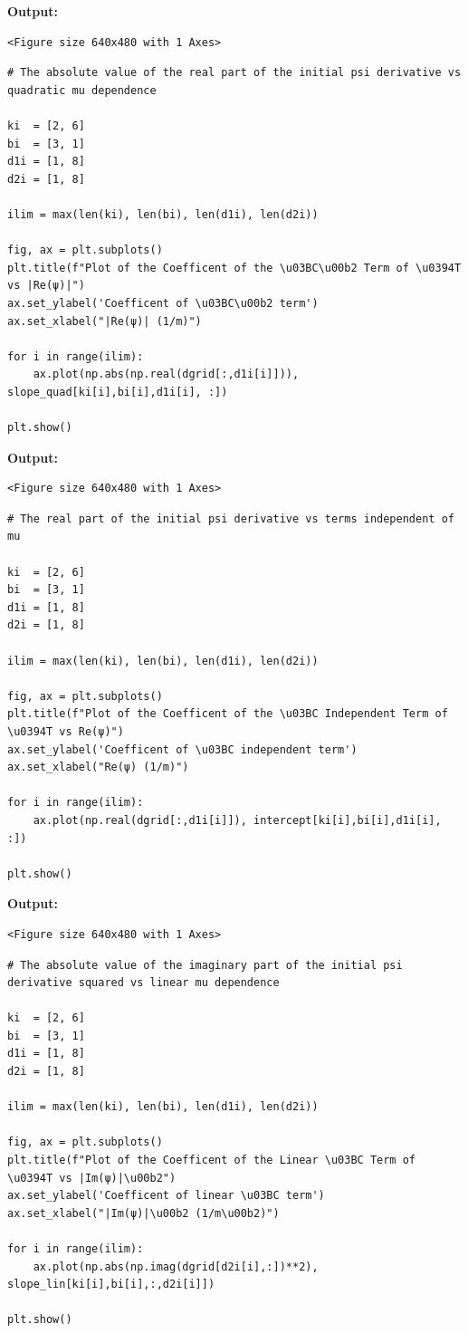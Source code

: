\documentclass{article}
\begin{document}
\textbf{Output:}\begin{verbatim}
<Figure size 640x480 with 1 Axes>
\end{verbatim}

\begin{lstlisting}
# The absolute value of the real part of the initial psi derivative vs quadratic mu dependence

ki  = [2, 6]
bi  = [3, 1]
d1i = [1, 8]
d2i = [1, 8]

ilim = max(len(ki), len(bi), len(d1i), len(d2i))

fig, ax = plt.subplots()
plt.title(f"Plot of the Coefficent of the \u03BC\u00b2 Term of \u0394T vs |Re(ψ)|")
ax.set_ylabel('Coefficent of \u03BC\u00b2 term')
ax.set_xlabel("|Re(ψ)| (1/m)")

for i in range(ilim):
    ax.plot(np.abs(np.real(dgrid[:,d1i[i]])), slope_quad[ki[i],bi[i],d1i[i], :])

plt.show()\end{lstlisting}

\textbf{Output:}\begin{verbatim}
<Figure size 640x480 with 1 Axes>
\end{verbatim}

\begin{lstlisting}
# The real part of the initial psi derivative vs terms independent of mu

ki  = [2, 6]
bi  = [3, 1]
d1i = [1, 8]
d2i = [1, 8]

ilim = max(len(ki), len(bi), len(d1i), len(d2i))

fig, ax = plt.subplots()
plt.title(f"Plot of the Coefficent of the \u03BC Independent Term of \u0394T vs Re(ψ)")
ax.set_ylabel('Coefficent of \u03BC independent term')
ax.set_xlabel("Re(ψ) (1/m)")

for i in range(ilim):
    ax.plot(np.real(dgrid[:,d1i[i]]), intercept[ki[i],bi[i],d1i[i], :])

plt.show()\end{lstlisting}

\textbf{Output:}\begin{verbatim}
<Figure size 640x480 with 1 Axes>
\end{verbatim}

\begin{lstlisting}
# The absolute value of the imaginary part of the initial psi derivative squared vs linear mu dependence

ki  = [2, 6]
bi  = [3, 1]
d1i = [1, 8]
d2i = [1, 8]

ilim = max(len(ki), len(bi), len(d1i), len(d2i))

fig, ax = plt.subplots()
plt.title(f"Plot of the Coefficent of the Linear \u03BC Term of \u0394T vs |Im(ψ)|\u00b2")
ax.set_ylabel('Coefficent of linear \u03BC term')
ax.set_xlabel("|Im(ψ)|\u00b2 (1/m\u00b2)")

for i in range(ilim):
    ax.plot(np.abs(np.imag(dgrid[d2i[i],:])**2), slope_lin[ki[i],bi[i],:,d2i[i]])

plt.show()\end{lstlisting}
\end{document}
